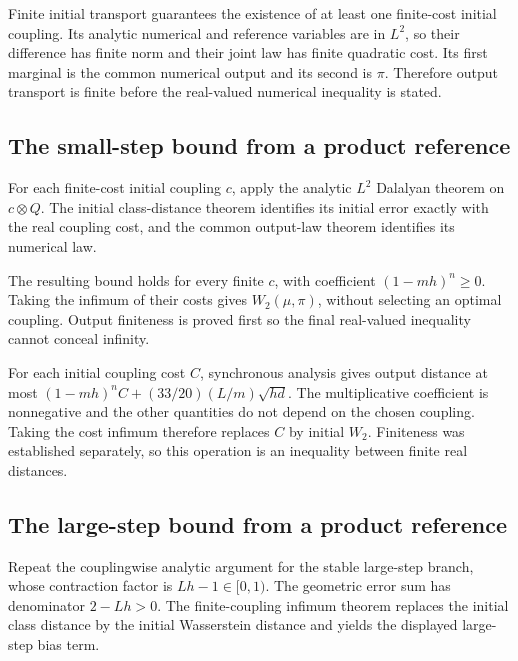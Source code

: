 \documentclass[11pt,a4paper]{report}
\begin{document}
Finite initial transport guarantees the existence of at least one finite-cost initial coupling. Its analytic numerical and reference variables are in \(L^2\), so their difference has finite norm and their joint law has finite quadratic cost. Its first marginal is the common numerical output and its second is \(\pi\). Therefore output transport is finite before the real-valued numerical inequality is stated.

\subsection{\texorpdfstring{The small-step bound from a product reference}{The small-step bound from a product reference}}
\label{report-step-UnadjustedLangevin-ProductReference-lean-12}


For each finite-cost initial coupling \(c\), apply the analytic \(L^2\) Dalalyan theorem on \(c\otimes Q\). The initial class-distance theorem identifies its initial error exactly with the real coupling cost, and the common output-law theorem identifies its numerical law.



The resulting bound holds for every finite \(c\), with coefficient \((1-mh)^n\ge0\). Taking the infimum of their costs gives \(W_2(\mu,\pi)\), without selecting an optimal coupling. Output finiteness is proved first so the final real-valued inequality cannot conceal infinity.



For each initial coupling cost \(C\), synchronous analysis gives output distance at most \((1-mh)^nC+(33/20)(L/m)\sqrt{hd}\). The multiplicative coefficient is nonnegative and the other quantities do not depend on the chosen coupling. Taking the cost infimum therefore replaces \(C\) by initial \(W_2\). Finiteness was established separately, so this operation is an inequality between finite real distances.

\subsection{\texorpdfstring{The large-step bound from a product reference}{The large-step bound from a product reference}}
\label{report-step-UnadjustedLangevin-ProductReference-lean-13}


Repeat the couplingwise analytic argument for the stable large-step branch, whose contraction factor is \(Lh-1\in[0,1)\). The geometric error sum has denominator \(2-Lh>0\). The finite-coupling infimum theorem replaces the initial class distance by the initial Wasserstein distance and yields the displayed large-step bias term.
\end{document}

